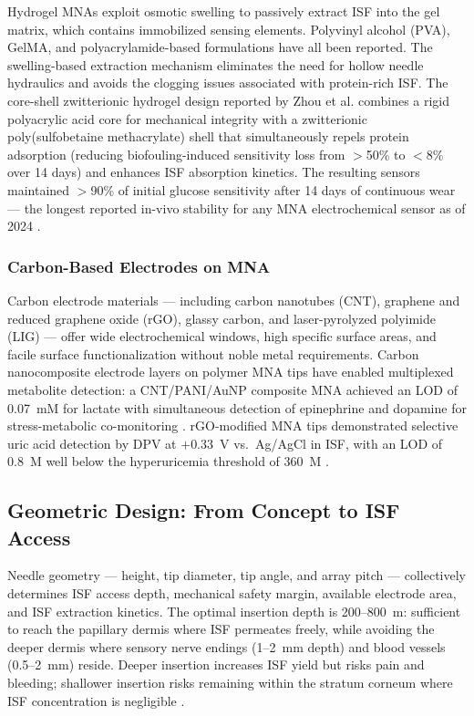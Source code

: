 \documentclass[review,1p]{elsarticle}
\begin{document}
Hydrogel MNAs exploit osmotic swelling to passively extract ISF into the gel matrix, which contains immobilized sensing elements. Polyvinyl alcohol (PVA), GelMA, and polyacrylamide-based formulations have all been reported. The swelling-based extraction mechanism eliminates the need for hollow needle hydraulics and avoids the clogging issues associated with protein-rich ISF. The core-shell zwitterionic hydrogel design reported by Zhou et al. \cite{Zhou2024} combines a rigid polyacrylic acid core for mechanical integrity with a zwitterionic poly(sulfobetaine methacrylate) shell that simultaneously repels protein adsorption (reducing biofouling-induced sensitivity loss from $>$50\% to $<$8\% over 14 days) and enhances ISF absorption kinetics. The resulting sensors maintained $>$90\% of initial glucose sensitivity after 14 days of continuous wear — the longest reported in-vivo stability for any MNA electrochemical sensor as of 2024 \cite{Zhou2024}.

\subsubsection{Carbon-Based Electrodes on MNA}

Carbon electrode materials — including carbon nanotubes (CNT), graphene and reduced graphene oxide (rGO), glassy carbon, and laser-pyrolyzed polyimide (LIG) — offer wide electrochemical windows, high specific surface areas, and facile surface functionalization without noble metal requirements. Carbon nanocomposite electrode layers on polymer MNA tips have enabled multiplexed metabolite detection: a CNT/PANI/AuNP composite MNA achieved an LOD of 0.07~mM for lactate with simultaneous detection of epinephrine and dopamine for stress-metabolic co-monitoring \cite{Mugo2023Talanta}. rGO-modified MNA tips demonstrated selective uric acid detection by DPV at $+0.33$~V vs.~Ag/AgCl in ISF, with an LOD of 0.8~\textmu{}M well below the hyperuricemia threshold of 360~\textmu{}M \cite{Wang2023rGO}.

\subsection{Geometric Design: From Concept to ISF Access}
\label{subsec:geometry}

Needle geometry — height, tip diameter, tip angle, and array pitch — collectively determines ISF access depth, mechanical safety margin, available electrode area, and ISF extraction kinetics. The optimal insertion depth is 200--800~\textmu{}m: sufficient to reach the papillary dermis where ISF permeates freely, while avoiding the deeper dermis where sensory nerve endings (1--2~mm depth) and blood vessels (0.5--2~mm) reside. Deeper insertion increases ISF yield but risks pain and bleeding; shallower insertion risks remaining within the stratum corneum where ISF concentration is negligible \cite{Friedel2023}.
\end{document}
